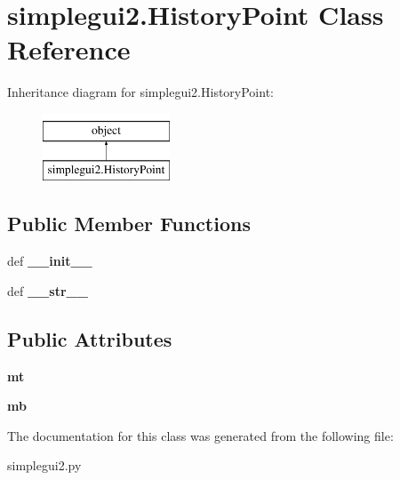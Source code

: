 \hypertarget{classsimplegui2_1_1_history_point}{\section{simplegui2.\-History\-Point Class Reference}
\label{classsimplegui2_1_1_history_point}
}
Inheritance diagram for simplegui2.\-History\-Point\-:\begin{figure}[H]
\begin{center}
\leavevmode
\includegraphics[height=2.000000cm]{classsimplegui2_1_1_history_point}
\end{center}
\end{figure}
\subsection*{Public Member Functions}
\begin{DoxyCompactItemize}
\item 
\hypertarget{classsimplegui2_1_1_history_point_a3a946749d474e664be06040193f33a18}{def {\bfseries \-\_\-\-\_\-init\-\_\-\-\_\-}}\label{classsimplegui2_1_1_history_point_a3a946749d474e664be06040193f33a18}

\item 
\hypertarget{classsimplegui2_1_1_history_point_accbb7614a5525ad63f09cb913fee6896}{def {\bfseries \-\_\-\-\_\-str\-\_\-\-\_\-}}\label{classsimplegui2_1_1_history_point_accbb7614a5525ad63f09cb913fee6896}

\end{DoxyCompactItemize}
\subsection*{Public Attributes}
\begin{DoxyCompactItemize}
\item 
\hypertarget{classsimplegui2_1_1_history_point_aa9b4911507b7e9d44d0c976b1a875d78}{{\bfseries mt}}\label{classsimplegui2_1_1_history_point_aa9b4911507b7e9d44d0c976b1a875d78}

\item 
\hypertarget{classsimplegui2_1_1_history_point_a56b41cda3cf4030a2ebfea5fccb9cb6d}{{\bfseries mb}}\label{classsimplegui2_1_1_history_point_a56b41cda3cf4030a2ebfea5fccb9cb6d}

\end{DoxyCompactItemize}


The documentation for this class was generated from the following file\-:\begin{DoxyCompactItemize}
\item 
simplegui2.\-py\end{DoxyCompactItemize}
